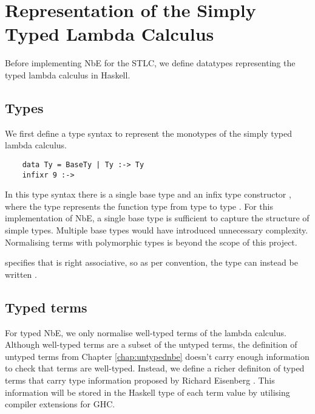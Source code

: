 \chapter{Representation of the Simply Typed Lambda Calculus}
\label{chap:typedlamadacalculus}

Before implementing NbE for the STLC, we define datatypes representing the typed lambda calculus in Haskell. 

\section{Types}

We first define a type syntax to represent the monotypes of the simply typed lambda calculus. 

\begin{lstlisting}
    data Ty = BaseTy | Ty :-> Ty 
    infixr 9 :->
\end{lstlisting}

In this type syntax there is a single base type  and an infix type constructor \code{:->}, where the type  represents the function type from type  to type . For this implementation of NbE, a single base type is sufficient to capture the structure of simple types. Multiple base types would have introduced unnecessary complexity.
Normalising terms with polymorphic types is beyond the scope of this project.
 
 specifies that \code{:->} is right associative, so as per convention, the type  can instead be written .

\section{Typed terms}

For typed NbE, we only normalise well-typed terms of the lambda calculus. Although well-typed terms are a subset of the untyped terms, the definition of untyped terms from Chapter \ref{chap:untypednbe} doesn't carry enough information to check that terms are well-typed. 
Instead, we define a richer definiton of typed terms that carry type information proposed by Richard Eisenberg \cite{GADTs}. This information will be stored in the Haskell type of each term value by utilising compiler extensions for GHC. 

